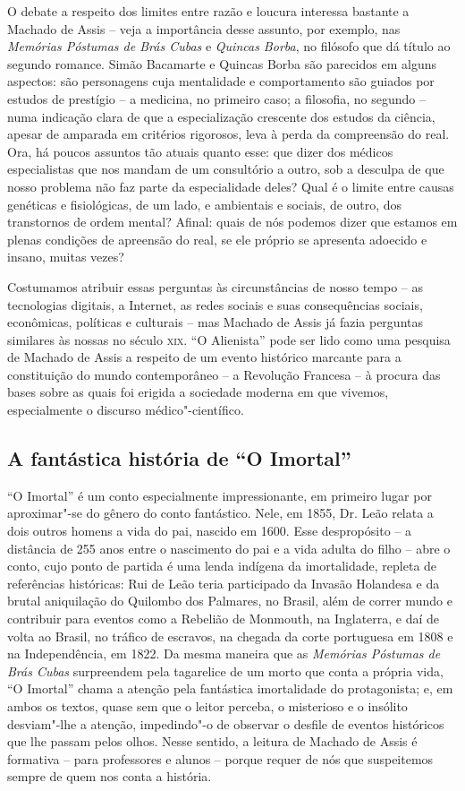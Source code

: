 \documentclass{extarticle}
\begin{document}
O debate a respeito dos limites entre razão e loucura interessa bastante
a Machado de Assis -- veja a importância desse assunto, por exemplo, nas
\emph{Memórias Póstumas de Brás Cubas} e \emph{Quincas Borba}, no
filósofo que dá título ao segundo romance. Simão Bacamarte e Quincas
Borba são parecidos em alguns aspectos: são personagens cuja mentalidade
e comportamento são guiados por estudos de prestígio -- a medicina, no
primeiro caso; a filosofia, no segundo -- numa indicação clara de que a
especialização crescente dos estudos da ciência, apesar de amparada em
critérios rigorosos, leva à perda da compreensão do real. Ora, há poucos
assuntos tão atuais quanto esse: que dizer dos médicos especialistas que
nos mandam de um consultório a outro, sob a desculpa de que nosso
problema não faz parte da especialidade deles? Qual é o limite entre
causas genéticas e fisiológicas, de um lado, e ambientais e sociais, de
outro, dos transtornos de ordem mental? Afinal: quais de nós podemos
dizer que estamos em plenas condições de apreensão do real, se ele
próprio se apresenta adoecido e insano, muitas vezes?

Costumamos atribuir essas perguntas às circunstâncias de nosso tempo --
as tecnologias digitais, a Internet, as redes sociais e suas
consequências sociais, econômicas, políticas e culturais -- mas Machado
de Assis já fazia perguntas similares às nossas no século \textsc{xix}. ``O
Alienista'' pode ser lido como uma pesquisa de Machado de Assis a
respeito de um evento histórico marcante para a constituição do mundo
contemporâneo -- a Revolução Francesa -- à procura das bases sobre as
quais foi erigida a sociedade moderna em que vivemos, especialmente o
discurso médico"-científico.

\subsection{A fantástica história de ``O Imortal''}

``O Imortal'' é um conto especialmente impressionante, em primeiro lugar
por aproximar"-se do gênero do conto fantástico. Nele, em 1855, Dr. Leão
relata a dois outros homens a vida do pai, nascido em 1600. Esse
despropósito -- a distância de 255 anos entre o nascimento do pai e a
vida adulta do filho -- abre o conto, cujo ponto de partida é uma lenda
indígena da imortalidade, repleta de referências históricas: Rui de Leão
teria participado da Invasão Holandesa e da brutal aniquilação do
Quilombo dos Palmares, no Brasil, além de correr mundo e contribuir para
eventos como a Rebelião de Monmouth, na Inglaterra, e daí de volta ao
Brasil, no tráfico de escravos, na chegada da corte portuguesa em 1808 e
na Independência, em 1822. Da mesma maneira que as \emph{Memórias
Póstumas de Brás Cubas} surpreendem pela tagarelice de um morto que
conta a própria vida, ``O Imortal'' chama a atenção pela fantástica
imortalidade do protagonista; e, em ambos os textos, quase sem que o
leitor perceba, o misterioso e o insólito desviam"-lhe a atenção,
impedindo"-o de observar o desfile de eventos históricos que lhe passam
pelos olhos. Nesse sentido, a leitura de Machado de Assis é formativa --
para professores e alunos -- porque requer de nós que suspeitemos sempre
de quem nos conta a história.
\end{document}
